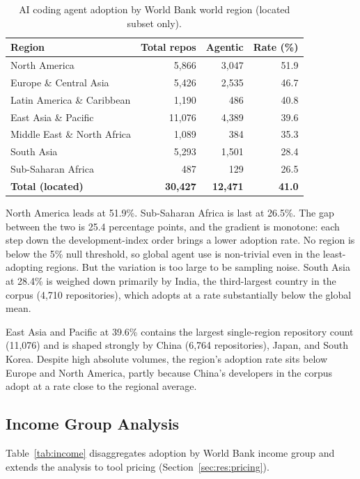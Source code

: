 \begin{table}[h]
\centering
\caption{AI coding agent adoption by World Bank world region (located subset only).}
\label{tab:regions}
\begin{tabular}{@{}lrrr@{}}
\toprule
Region & Total repos & Agentic & Rate (\%) \\
\midrule
North America                  & 5,866  & 3,047 & 51.9 \\
Europe \& Central Asia         & 5,426  & 2,535 & 46.7 \\
Latin America \& Caribbean     & 1,190  &   486 & 40.8 \\
East Asia \& Pacific           & 11,076 & 4,389 & 39.6 \\
Middle East \& North Africa    & 1,089  &   384 & 35.3 \\
South Asia                     & 5,293  & 1,501 & 28.4 \\
Sub-Saharan Africa             &   487  &   129 & 26.5 \\
\midrule
\textbf{Total (located)}       & \textbf{30,427} & \textbf{12,471} & \textbf{41.0} \\
\bottomrule
\end{tabular}
\end{table}

North America leads at 51.9\%. Sub-Saharan Africa is last at 26.5\%. The gap between the two is 25.4 percentage points, and the gradient is monotone: each step down the development-index order brings a lower adoption rate. No region is below the 5\% null threshold, so global agent use is non-trivial even in the least-adopting regions. But the variation is too large to be sampling noise. South Asia at 28.4\% is weighed down primarily by India, the third-largest country in the corpus (4,710 repositories), which adopts at a rate substantially below the global mean.

East Asia and Pacific at 39.6\% contains the largest single-region repository count (11,076) and is shaped strongly by China (6,764 repositories), Japan, and South Korea. Despite high absolute volumes, the region's adoption rate sits below Europe and North America, partly because China's developers in the corpus adopt at a rate close to the regional average.

\subsection{Income Group Analysis}

Table~\ref{tab:income} disaggregates adoption by World Bank income group and extends the analysis to tool pricing (Section~\ref{sec:res:pricing}).

